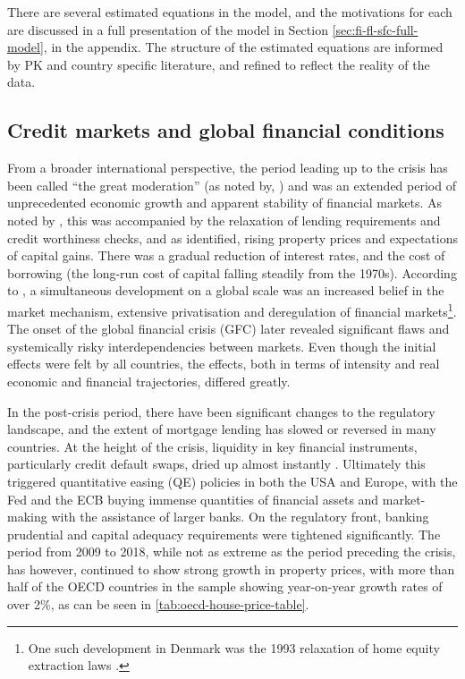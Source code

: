 \documentclass[
]{book}
\begin{document}
There are several estimated equations in the model, and the motivations for each are discussed in a full presentation of the model in Section \ref{sec:fi-fl-sfc-full-model}, in the appendix. The structure of the estimated equations are informed by PK and country specific literature, and refined to reflect the reality of the data.

\hypertarget{credit-markets-and-global-financial-conditions}{%
\subsection{Credit markets and global financial conditions}\label{credit-markets-and-global-financial-conditions}}

From a broader international perspective, the period leading up to the crisis has been called ``the great moderation'' (as noted by, \citet[pp.~28]{Buttiglione2014}) and was an extended period of unprecedented economic growth and apparent stability of financial markets. As noted by \citet{englund1999}, this was accompanied by the relaxation of lending requirements and credit worthiness checks, and as \citet{scanlon2008} identified, rising property prices and expectations of capital gains. There was a gradual reduction of interest rates, and the cost of borrowing (the long-run cost of capital falling steadily from the 1970s). According to \citet{scanlon2008}, a simultaneous development on a global scale was an increased belief in the market mechanism, extensive privatisation and deregulation of financial markets\footnote{One such development in Denmark was the 1993 relaxation of home equity extraction laws \citep{Andersen2019}.}. The onset of the global financial crisis (GFC) later revealed significant flaws and systemically risky interdependencies between markets. Even though the initial effects were felt by all countries, the effects, both in terms of intensity and real economic and financial trajectories, differed greatly. \citep{lunde2014introduction}

In the post-crisis period, there have been significant changes to the regulatory landscape, and the extent of mortgage lending has slowed or reversed in many countries. At the height of the crisis, liquidity in key financial instruments, particularly credit default swaps, dried up almost instantly \citep{danmarksnationalbank2008}. Ultimately this triggered quantitative easing (QE) policies in both the USA and Europe, with the Fed and the ECB buying immense quantities of financial assets and market-making with the assistance of larger banks. On the regulatory front, banking prudential and capital adequacy requirements were tightened significantly. The period from 2009 to 2018, while not as extreme as the period preceding the crisis, has however, continued to show strong growth in property prices, with more than half of the OECD countries in the sample showing year-on-year growth rates of over 2\%, as can be seen in \ref{tab:oecd-house-price-table}.
\end{document}

